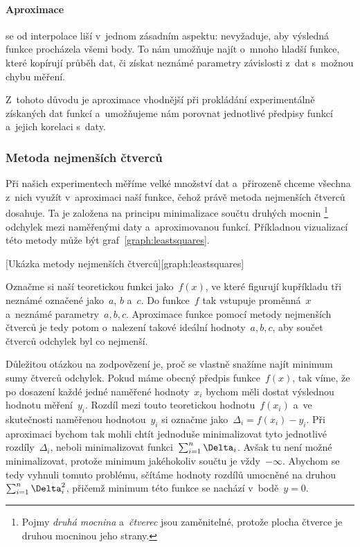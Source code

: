 \paragraph{Aproximace} se od interpolace liší v~jednom zásadním aspektu:
nevyžaduje, aby výsledná funkce procházela všemi body. To nám umožňuje najít
o~mnoho hladší funkce, které kopírují průběh dat, či získat neznámé parametry
závislosti z~dat s~možnou chybu měření. 

Z~tohoto důvodu je aproximace vhodnější při prokládání experimentálně získaných
dat funkcí a~umožňujeme nám porovnat jednotlivé předpisy funkcí a~jejich
korelaci s~daty.

\subsubsection{Metoda nejmenších čtverců}
\label{sec:čtverce}
Při našich experimentech měříme velké množství dat a~přirozeně chceme všechna
z~nich využít v~aproximaci naší funkce, čehož právě metoda nejmenších čtverců
dosahuje. Ta je založena na principu minimalizace součtu druhých mocnin%
\footnote{Pojmy \emph{druhá mocnina} a~\emph{čtverec} jsou zaměnitelné, protože
plocha čtverce je druhou mocninou jeho strany.} odchylek mezi naměřenými daty
a~aproximovanou funkcí. Příkladnou vizualizací této metody může být
graf~\ref{graph:leastsquares}.

[Ukázka metody nejmenších čtverců][graph:leastsquares]

Označme si naší teoretickou funkci  jako~$f(x)$, ve které figurují kupříkladu
tři neznámé označené  jako~$a$, $b$ a~$c$. Do funkce~$f$ tak vstupuje
proměnná~$x$ a~neznámé parametry~$a,b,c$. Aproximace funkce pomocí metody
nejmenších čtverců je tedy potom o~nalezení takové ideální  hodnoty~$a,b,c$,
aby součet čtverců odchylek byl co nejmenší.

Důležitou otázkou na zodpovězení je, proč se vlastně snažíme najít minimum sumy
čtverců odchylek. Pokud máme obecný předpis funkce~$f(x)$, tak víme, že po
dosazení každé jedné naměřené hodnoty~$x_i$ bychom měli dostat výslednou
hodnotu měření~$y_i$. Rozdíl mezi touto teoretickou hodnotu~$f(x_i)$ a~ve
skutečnosti naměřenou hodnotou~$y_i$ si označme jako~$\Delta_i = f(x_i)-y_i$.
Při aproximaci bychom tak mohli chtít jednoduše minimalizovat tyto jednotlivé
rozdíly~$\Delta_i$, neboli minimalizovat funkci~$\nsum \Delta_i$. Avšak tu není
možné minimalizovat, protože minimum jakéhokoliv součtu   je vždy~$-\infty$.
Abychom se tedy vyhnuli tomuto problému, sčítáme hodnoty rozdílů umocněné na
druhou~$\nsum \Delta_i^2$, přičemž minimum této funkce se nachází
v~bodě~$y=0$.~\cite{praktikum}

